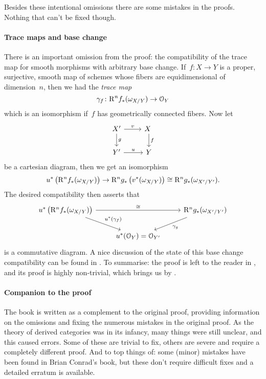 Besides these intentional omissions there are some mistakes in the proofs. Nothing that can't be fixed though.

\paragraph{Trace maps and base change}
There is an important omission from the proof: the compatibility of the trace map for smooth morphisms with arbitrary base change. If~$f\colon X\to Y$ is a proper, surjective, smooth map of schemes whose fibers are equidimensional of dimension~$n$, then we had the \emph{trace map} \cite[\S VII.4]{hartshorne-residues-and-duality}
\begin{equation}
  \gamma_f\colon\mathrm{R}^nf_*(\omega_{X/Y})\to\mathcal{O}_Y
\end{equation}
which is an isomorphism if~$f$ has geometrically connected fibers. Now let
\begin{equation}
  \begin{tikzcd}
    X' \arrow{r}{v} \arrow{d}{g} & X \arrow{d}{f} \\
    Y' \arrow{r}{u} & Y
  \end{tikzcd}
\end{equation}
be a cartesian diagram, then we get an isomorphism
\begin{equation}
  u^*\left( \mathrm{R}^nf_*(\omega_{X/Y}) \right)\to\mathrm{R}^ng_*\left( v^*(\omega_{X/Y}) \right)\cong\mathrm{R}^ng_*(\omega_{X'/Y'}).
\end{equation}
The desired compatibility then asserts that
\begin{equation}
  \begin{tikzcd}
    u^*\left( \RR^nf_*(\omega_{X/Y}) \right) \arrow{rr}{\cong} \arrow{rd}{u^*(\gamma_f)} & & \RR^ng_*(\omega_{X'/Y'}) \arrow{ld}{\gamma_{g}} \\
    & u^*(\mathcal{O}_Y)=\mathcal{O}_{Y'}
  \end{tikzcd}
\end{equation}
is a commutative diagram. A nice discussion of the state of this base change compatibility can be found in \cite[\S 1.1]{conrad-grothendieck-duality-and-base-change}. To summarise: the proof is left to the reader in \cite[\S VII.4]{hartshorne-residues-and-duality}, and its proof is highly non-trivial, which brings us by \cite{conrad-grothendieck-duality-and-base-change}.

\paragraph{Companion to the proof}
The book \cite{conrad-grothendieck-duality-and-base-change} is written as a complement to the original proof, providing information on the omissions and fixing the numerous mistakes in the original proof. As the theory of derived categories was in its infancy, many things were still unclear, and this caused errors. Some of these are trivial to fix, others are severe and require a completely different proof. And to top things of: some (minor) mistakes have been found in Brian Conrad's book, but these don't require difficult fixes and a detailed erratum is available.

